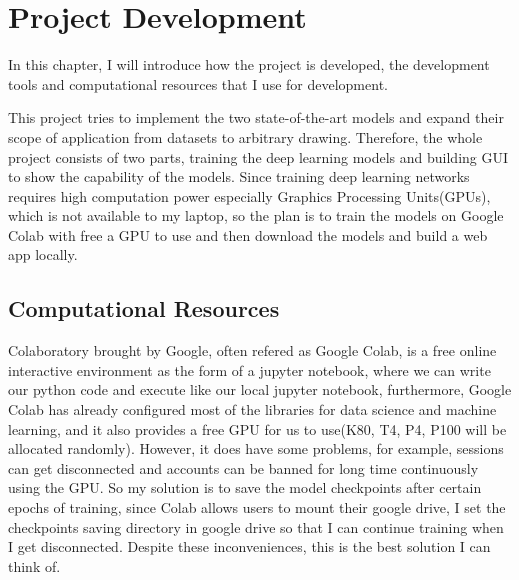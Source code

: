 \chapter{Project Development}
In this chapter, I will introduce how the project is developed,
the development tools and computational resources that I use for 
development.

This project tries to implement the two state-of-the-art models and 
expand their scope of application from datasets to arbitrary drawing.
Therefore, the whole project consists of two parts, training the deep 
learning models and building GUI to show the capability of the models.
Since training deep learning networks requires high computation power 
especially Graphics Processing Units(GPUs), which is not available to 
my laptop, so the plan is to train the models on Google Colab with 
free a GPU to use and then download the models and build a web app locally.

\section{Computational Resources}
Colaboratory brought by Google, often refered as Google Colab, is a 
free online interactive environment as the form of a jupyter notebook,
where we can write our python code and execute like our local jupyter 
notebook, furthermore, Google Colab has already configured most of the 
libraries for data science and machine learning, and it also provides 
a free GPU for us to use(K80, T4, P4, P100 will be allocated randomly).
However, it does have some problems, for example, sessions can get 
disconnected and accounts can be banned for long time continuously 
using the GPU. So my solution is to save the model checkpoints after 
certain epochs of training, since Colab allows users to mount their google drive, 
I set the checkpoints saving directory in google drive so that I can 
continue training when I get disconnected.
Despite these inconveniences, this is the best solution 
I can think of. 


